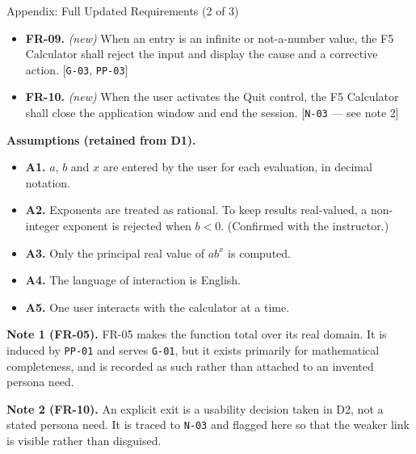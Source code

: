 \documentclass[11pt]{beamer}
\begin{document}
\begin{frame}{Appendix: Full Updated Requirements (2 of 3)}
  \scriptsize
  \begin{itemize}
    \item \textbf{FR-09.} \emph{(new)} When an entry is an infinite or
          not-a-number value, the F5 Calculator shall reject the input and
          display the cause and a corrective action.
          [\texttt{G-03}, \texttt{PP-03}]
    \item \textbf{FR-10.} \emph{(new)} When the user activates the Quit
          control, the F5 Calculator shall close the application window and
          end the session. [\texttt{N-03} --- see note 2]
  \end{itemize}
  \medskip
  \textbf{Assumptions (retained from D1).}
  \begin{itemize}
    \item \textbf{A1.} $a$, $b$ and $x$ are entered by the user for each
          evaluation, in decimal notation.
    \item \textbf{A2.} Exponents are treated as rational. To keep results
          real-valued, a non-integer exponent is rejected when $b < 0$.
          (Confirmed with the instructor.)
    \item \textbf{A3.} Only the principal real value of $ab^{x}$ is computed.
    \item \textbf{A4.} The language of interaction is English.
    \item \textbf{A5.} One user interacts with the calculator at a time.
  \end{itemize}
  \medskip
  \textbf{Note 1 (FR-05).} FR-05 makes the function total over its real
  domain. It is induced by \texttt{PP-01} and serves \texttt{G-01}, but it
  exists primarily for mathematical completeness, and is recorded as such
  rather than attached to an invented persona need.
  \smallskip

  \textbf{Note 2 (FR-10).} An explicit exit is a usability decision taken in
  D2, not a stated persona need. It is traced to \texttt{N-03} and flagged
  here so that the weaker link is visible rather than disguised.
\end{frame}
\end{document}
